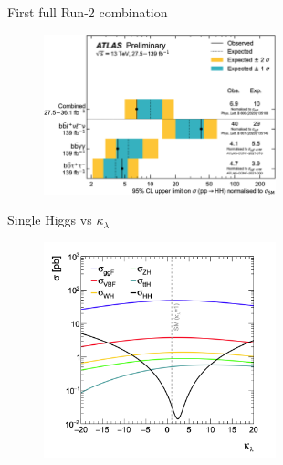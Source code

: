 \begin{frame}{First full Run-2 combination}
    
\begin{figure}
    \centering
    \includegraphics[width=0.6\textwidth]{BackUp/Part3/Img/full_Run_2_comb.png}
\end{figure}    
\end{frame}
\begin{frame}{Single Higgs vs $\kappa_{\lambda}$}
    \begin{figure}
        \centering
        \includegraphics[width=0.6\textwidth]{BackUp/Part3/Img/Single_Higgs_as_kl.png}
    \end{figure}
\end{frame}

